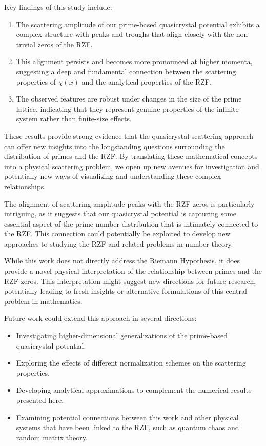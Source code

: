 \documentclass[11pt, oneside]{article}
\begin{document}
Key findings of this study include:

\begin{enumerate}
    \item The scattering amplitude of our prime-based quasicrystal potential exhibits a complex structure with peaks and troughs that align closely with the non-trivial zeros of the RZF.
    \item This alignment persists and becomes more pronounced at higher momenta, suggesting a deep and fundamental connection between the scattering properties of $\chi(x)$ and the analytical properties of the RZF.
    \item The observed features are robust under changes in the size of the prime lattice, indicating that they represent genuine properties of the infinite system rather than finite-size effects.
\end{enumerate}

These results provide strong evidence that the quasicrystal scattering approach can offer new insights into the longstanding questions surrounding the distribution of primes and the RZF. By translating these mathematical concepts into a physical scattering problem, we open up new avenues for investigation and potentially new ways of visualizing and understanding these complex relationships.

The alignment of scattering amplitude peaks with the RZF zeros is particularly intriguing, as it suggests that our quasicrystal potential is capturing some essential aspect of the prime number distribution that is intimately connected to the RZF. This connection could potentially be exploited to develop new approaches to studying the RZF and related problems in number theory.

While this work does not directly address the Riemann Hypothesis, it does provide a novel physical interpretation of the relationship between primes and the RZF zeros. This interpretation might suggest new directions for future research, potentially leading to fresh insights or alternative formulations of this central problem in mathematics.

Future work could extend this approach in several directions:

\begin{itemize}
    \item Investigating higher-dimensional generalizations of the prime-based quasicrystal potential.
    \item Exploring the effects of different normalization schemes on the scattering properties.
    \item Developing analytical approximations to complement the numerical results presented here.
    \item Examining potential connections between this work and other physical systems that have been linked to the RZF, such as quantum chaos and random matrix theory.
\end{itemize}
\end{document}
